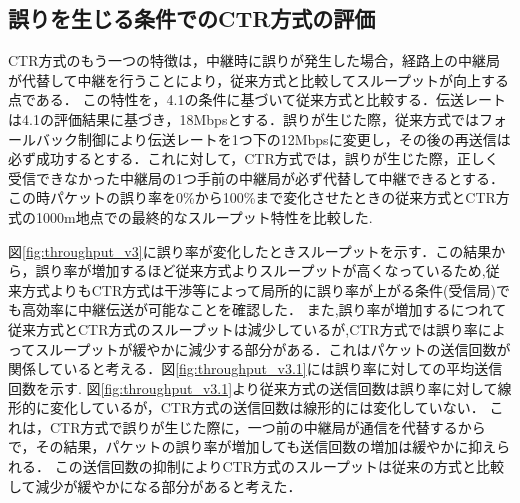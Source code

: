 \documentclass[a4paper,10.5pt]{ltjsarticle}
\begin{document}
\subsection{誤りを生じる条件でのCTR方式の評価}
CTR方式のもう一つの特徴は，中継時に誤りが発生した場合，経路上の中継局が代替して中継を行うことにより，従来方式と比較してスループットが向上する点である．
この特性を，4.1の条件に基づいて従来方式と比較する．伝送レートは4.1の評価結果に基づき，18Mbpsとする．誤りが生じた際，従来方式ではフォールバック制御により伝送レートを1つ下の12Mbpsに変更し，その後の再送信は必ず成功するとする．これに対して，CTR方式では，誤りが生じた際，正しく受信できなかった中継局の1つ手前の中継局が必ず代替して中継できるとする．
この時パケットの誤り率を0\%から100\%まで変化させたときの従来方式とCTR方式の1000m地点での最終的なスループット特性を比較した.
\par
図\ref{fig:throughput_v3}に誤り率が変化したときスループットを示す．この結果から，誤り率が増加するほど従来方式よりスループットが高くなっているため,従来方式よりもCTR方式は干渉等によって局所的に誤り率が上がる条件(受信局)でも高効率に中継伝送が可能なことを確認した．
また,誤り率が増加するにつれて従来方式とCTR方式のスループットは減少しているが,CTR方式では誤り率によってスループットが緩やかに減少する部分がある．これはパケットの送信回数が関係していると考える．図\ref{fig:throughput_v3.1}には誤り率に対しての平均送信回数を示す.
図\ref{fig:throughput_v3.1}より従来方式の送信回数は誤り率に対して線形的に変化しているが，CTR方式の送信回数は線形的には変化していない．
これは，CTR方式で誤りが生じた際に，一つ前の中継局が通信を代替するからで，その結果，パケットの誤り率が増加しても送信回数の増加は緩やかに抑えられる．
この送信回数の抑制によりCTR方式のスループットは従来の方式と比較して減少が緩やかになる部分があると考えた．
\end{document}
